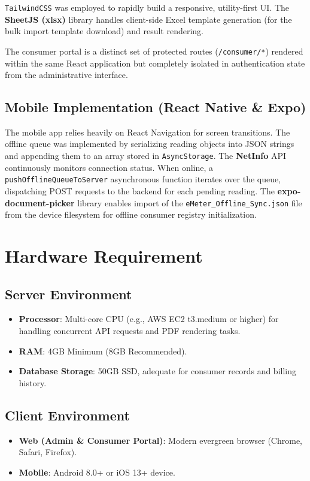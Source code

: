 \documentclass[12pt, a4paper, onecolumn]{report}
\begin{document}
\texttt{TailwindCSS} was employed to rapidly build a responsive, utility-first UI. The \textbf{SheetJS (xlsx)} library handles client-side Excel template generation (for the bulk import template download) and result rendering.

The consumer portal is a distinct set of protected routes (\texttt{/consumer/*}) rendered within the same React application but completely isolated in authentication state from the administrative interface.

\subsection{Mobile Implementation (React Native \& Expo)}
The mobile app relies heavily on React Navigation for screen transitions. The offline queue was implemented by serializing reading objects into JSON strings and appending them to an array stored in \texttt{AsyncStorage}. The \textbf{NetInfo} API continuously monitors connection status. When online, a \texttt{pushOfflineQueueToServer} asynchronous function iterates over the queue, dispatching POST requests to the backend for each pending reading. The \textbf{expo-document-picker} library enables import of the \texttt{eMeter\_Offline\_Sync.json} file from the device filesystem for offline consumer registry initialization.

\section{Hardware Requirement}
\subsection{Server Environment}
\begin{itemize}
    \item \textbf{Processor}: Multi-core CPU (e.g., AWS EC2 t3.medium or higher) for handling concurrent API requests and PDF rendering tasks.
    \item \textbf{RAM}: 4GB Minimum (8GB Recommended).
    \item \textbf{Database Storage}: 50GB SSD, adequate for consumer records and billing history.
\end{itemize}

\subsection{Client Environment}
\begin{itemize}
    \item \textbf{Web (Admin \& Consumer Portal)}: Modern evergreen browser (Chrome, Safari, Firefox).
    \item \textbf{Mobile}: Android 8.0+ or iOS 13+ device.
\end{itemize}
\end{document}
